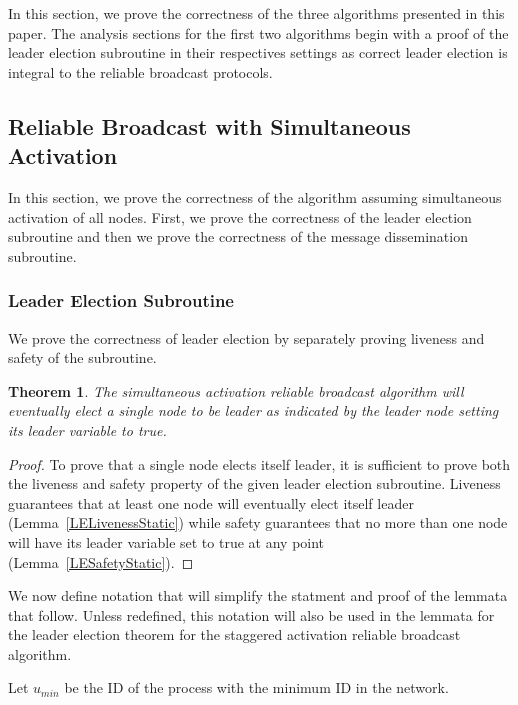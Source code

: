 \documentclass[english]{article}
\newtheorem{theorem}{Theorem}[section]
\begin{document}
In this section, we prove the correctness of the three algorithms presented in this paper. The analysis sections for the first two algorithms begin with a proof of the leader election subroutine in their respectives settings as correct leader election is integral to the reliable broadcast protocols.

\subsection {Reliable Broadcast with Simultaneous Activation}

In this section, we prove the correctness of the algorithm assuming simultaneous activation of all nodes. First, we prove the correctness of the leader election subroutine and then we prove the correctness of the message dissemination subroutine.

\subsubsection{Leader Election Subroutine}

We prove the correctness of leader election by separately proving liveness and safety of the subroutine.

\begin{theorem}
\label{LeaderElectionStatic}
The simultaneous activation reliable broadcast algorithm will eventually elect a single node to be leader as indicated by the leader node setting its leader variable to true.
\end{theorem}
\begin{proof}
To prove that a single node elects itself leader, it is sufficient to prove both the liveness and safety property of the given leader election subroutine. Liveness guarantees that at least one node will eventually elect itself leader (Lemma~\ref{LELivenessStatic}) while safety guarantees that no more than one node will have its leader variable set to true at any point (Lemma~\ref{LESafetyStatic}).
\end{proof}

We now define notation that will simplify the statment and proof of the lemmata that follow. Unless redefined, this notation will also be used in the lemmata for the leader election theorem for the staggered activation reliable broadcast algorithm.

\begin{definition}
Let $u_{min}$ be the ID of the process with the minimum ID in the network. 
\end{definition}
\end{document}
